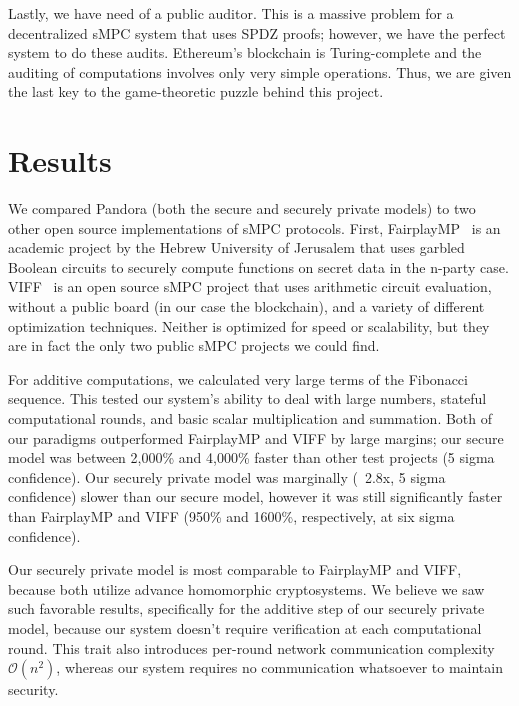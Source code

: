 \documentclass[journal]{IEEEtran}
\begin{document}
\par Lastly, we have need of a public auditor. This is a massive problem for a decentralized sMPC system that uses SPDZ proofs; however, we have the perfect system to do these audits. Ethereum's blockchain is Turing-complete and the auditing of computations involves only very simple operations. Thus, we are given the last key to the game-theoretic puzzle behind this project.


\section{Results}
\par We compared Pandora (both the secure and securely private models) to two other open source implementations of sMPC protocols. First, FairplayMP~\cite{Ben-David2008FairplayMP:Computation} is an academic project by the Hebrew University of Jerusalem that uses garbled Boolean circuits to securely compute functions on secret data in the n-party case. VIFF~\cite{Geisler2007VIFF:Framework} is an open source sMPC project that uses arithmetic circuit evaluation, without a public board (in our case the blockchain), and a variety of different optimization techniques. Neither is optimized for speed or scalability, but they are in fact the only two public sMPC projects we could find.

\par For additive computations, we calculated very large terms of the Fibonacci sequence. This tested our system’s ability to deal with large numbers, stateful computational rounds, and basic scalar multiplication and summation. Both of our paradigms outperformed FairplayMP and VIFF by large margins; our secure model was between 2,000\% and 4,000\% faster than other test projects (5 sigma confidence). Our securely private model was marginally (~2.8x, 5 sigma confidence) slower than our secure model, however it was still significantly faster than FairplayMP and VIFF (950\% and 1600\%, respectively, at six sigma confidence).

\par Our securely private model is most comparable to FairplayMP and VIFF, because both utilize advance homomorphic cryptosystems. We believe we saw such favorable results, specifically for the additive step of our securely private model, because our system doesn’t require verification at each computational round. This trait also introduces per-round network communication complexity $\mathcal{O}(n^2)$, whereas our system requires no communication whatsoever to maintain security.
\end{document}
